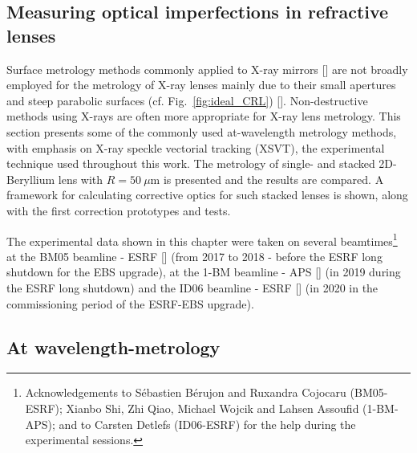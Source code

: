 \begin{refsection}
\chapter{Measuring optical imperfections in refractive lenses}\label{sec:measuring}

Surface metrology methods commonly applied to X-ray mirrors [\cite{Alcock2016, Vivo2019}] are not broadly employed for the metrology of X-ray lenses mainly due to their small apertures and steep parabolic surfaces (cf. Fig.~\ref{fig:ideal_CRL}) [\cite{Lyatun2015}]. Non-destructive methods using X-rays are often more appropriate for X-ray lens metrology. This section presents some of the commonly used at-wavelength metrology methods, with emphasis on X-ray speckle vectorial tracking (XSVT), the experimental technique used throughout this work. The metrology of single- and stacked 2D-Beryllium lens with $R=50~\mu$m is presented and the results are compared. A framework for calculating corrective optics for such stacked lenses is shown, along with the first correction prototypes and tests.

The experimental data shown in this chapter were taken on several beamtimes\footnote{Acknowledgements to Sébastien Bérujon and Ruxandra Cojocaru (BM05-ESRF); Xianbo Shi, Zhi Qiao, Michael Wojcik and Lahsen Assoufid (1-BM-APS); and to Carsten Detlefs (ID06-ESRF) for the help during the experimental sessions.} at the BM05 beamline - ESRF [\cite{Ziegler2004}] (from 2017 to 2018 - before the ESRF long shutdown for the EBS upgrade), at the 1-BM beamline - APS [\cite{Macrander2016}] (in 2019 during the ESRF long shutdown) and the ID06 beamline - ESRF [\cite{Kutsal_2019}] (in 2020 in the commissioning period of the ESRF-EBS upgrade).


\section{At wavelength-metrology}\label{sec:at_wavelength}


\end{refsection}

